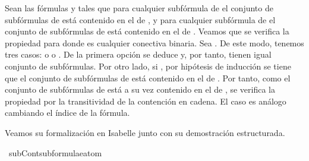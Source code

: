 \begin{isabellebody}
\begin{isamarkuptext}
\begin{demostracion}
  Sean las fórmulas  y  tales que para cualquier subfórmula 
  de  el conjunto de subfórmulas de  está contenido en el de 
  , y para cualquier subfórmula  de  el conjunto de 
  subfórmulas de  está contenido en el de . Veamos que se 
  verifica la propiedad para  donde \isa{{\isacharasterisk}} es cualquier conectiva 
  binaria. 
  Sea . De este modo,
  tenemos tres casos:  o  o 
  . De la primera opción se deduce  y, por
  tanto, tienen igual conjunto de subfórmulas. Por otro lado, si 
  , por hipótesis de inducción se tiene que el conjunto
  de subfórmulas de  está contenido en el de . Por tanto, 
  como el conjunto de subfórmulas de  está a su vez contenido en el 
  de , se verifica la propiedad por la transitividad de la 
  contención en cadena. El caso  es análogo cambiando el 
  índice de la fórmula.   
  \end{demostracion}%
\end{isamarkuptext}\isamarkuptrue%
%
\begin{isamarkuptext}%
Veamos su formalización en Isabelle junto con su demostración 
  estructurada.%
\end{isamarkuptext}\isamarkuptrue%
\isamarkupfalse%
\ subContsubformulae{\isacharunderscore}atom{\isacharcolon}\ \isanewline

\end{isabellebody}
